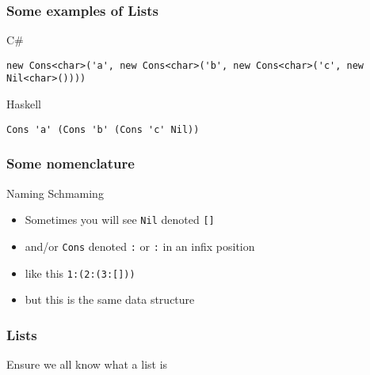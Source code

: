 \begin{frame}[fragile]
\frametitle{Some examples of Lists}
\begin{block}{C\#}
\begin{lstlisting}[style=csharp,basicstyle=\tiny\ttfamily,mathescape]
new Cons<char>('a', new Cons<char>('b', new Cons<char>('c', new Nil<char>())))
\end{lstlisting}
\end{block}
\begin{block}{Haskell}
\begin{lstlisting}[style=haskell,basicstyle=\scriptsize\ttfamily,mathescape]
Cons 'a' (Cons 'b' (Cons 'c' Nil))
\end{lstlisting}
\end{block}
\end{frame}

\begin{frame}
\frametitle{Some nomenclature}
\begin{block}{Naming Schmaming}
\begin{itemize}
\item<1-> Sometimes you will see \lstinline{Nil} denoted \lstinline{[]}
\item<2-> and/or \lstinline{Cons} denoted \lstinline{:} or \lstinline{:} in an infix position
\item<3-> like this \lstinline{1:(2:(3:[]))}
\item<4-> but this is the same data structure
\end{itemize}
\end{block}
\end{frame}

\begin{frame}
\frametitle{Lists}
\begin{center}
Ensure we all know what a list is
\end{center}
\end{frame}

